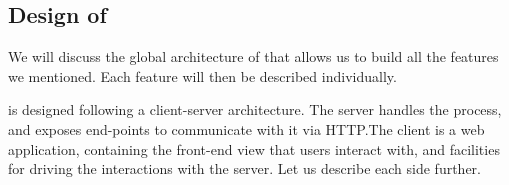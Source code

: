 \subsection{Design of \PeaCoq{}}

We will discuss the global architecture of \PeaCoq{} that allows us to build all
the features we mentioned.  Each feature will then be described individually.

\PeaCoq{} is designed following a client-server architecture.  The server
handles the \Coq{} process, and exposes end-points to communicate with it via
HTTP.\@ The client is a web application, containing the front-end view that users
interact with, and facilities for driving the interactions with the server.  Let
us describe each side further.

\tikzset{>=latex}

